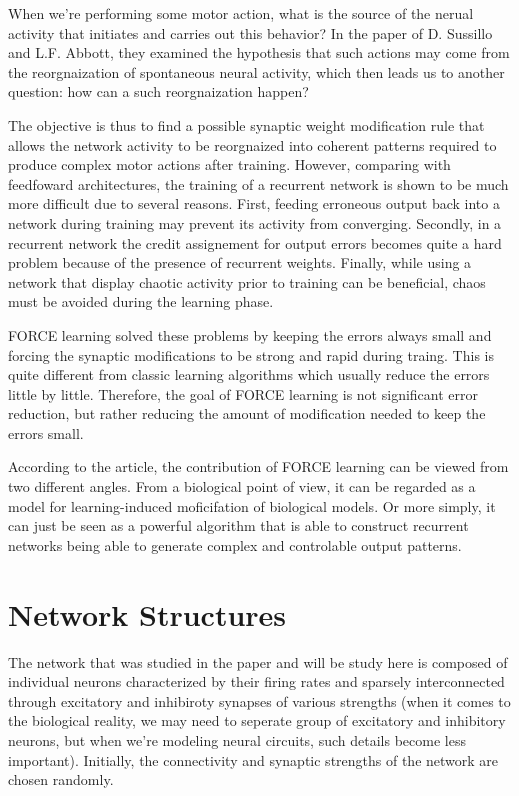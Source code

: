 When we're performing some motor action, what is the source of the nerual
activity that initiates and carries out this behavior? In the paper of
D. Sussillo and L.F. Abbott, they examined the hypothesis that such actions 
may come from the reorgnaization of spontaneous neural activity, which then
leads us to another question: how can a such reorgnaization happen?

The objective is thus to find a possible synaptic weight modification rule
that allows the network activity to be reorgnaized into coherent patterns 
required to produce complex motor actions after training. However, comparing
with feedfoward architectures, the training of a recurrent network is
shown to be much more difficult due to several reasons.
First, feeding erroneous output back into a network during training may
prevent its activity from converging. Secondly, in a recurrent network
the credit assignement for output errors becomes quite a hard problem because
of the presence of recurrent weights. Finally, while using a network that
display chaotic activity prior to training can be beneficial, chaos
must be avoided during the learning phase.

FORCE learning solved these problems by keeping the errors always small
and forcing the synaptic modifications to be strong and rapid during traing.
This is quite different from classic learning algorithms which usually
reduce the errors little by little. Therefore, the goal of FORCE learning
is not significant error reduction, but rather reducing the amount of
modification needed to keep the errors small.

According to the article, the contribution of FORCE learning can be
viewed from two different angles. From a biological point of view, it can
be regarded as a model for learning-induced moficifation of biological
models. Or more simply, it can just be seen as a powerful algorithm that
is able to construct recurrent networks being able to generate complex
and controlable output patterns.


\section{Network Structures}

The network that was studied in the paper and will be study here is composed
of individual neurons characterized by their firing rates and
sparsely interconnected through excitatory and inhibiroty synapses of 
various strengths (when it comes to the biological reality, we may need to
seperate group of excitatory and inhibitory neurons, but when we're modeling
neural circuits, such details become less important). Initially, the
connectivity and synaptic strengths of the network are chosen randomly.

